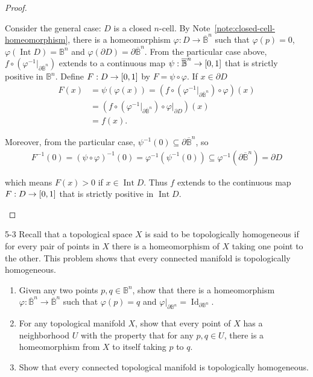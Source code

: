\begin{proof}
\begin{enumerate}[label={(\alph*)}]
		      Consider the general case: $D$ is a closed $n$-cell. By Note~\ref{note:closed-cell-homeomorphism}, there is a homeomorphism $\varphi: D \to \overline{\mathbb{B}}^{n}$ such that $\varphi(p) = 0$, $\varphi(\operatorname{Int} D) = \mathbb{B}^{n}$ and $\varphi(\partial D) = \partial\overline{\mathbb{B}}^{n}$. From the particular case above, $f\circ (\varphi^{-1}\vert_{\partial\overline{\mathbb{B}}^{n}})$ extends to a continuous map $\psi: \overline{\mathbb{B}}^{n} \to \left[{0, 1}\right]$ that is strictly positive in $\mathbb{B}^{n}$. Define $F: D \to \left[{0, 1}\right]$ by $F = \psi \circ \varphi$. If $x \in \partial D$
		      \begin{align*}
			      F(x) & = \psi(\varphi(x)) = (f\circ (\varphi^{-1}\vert_{\partial\overline{\mathbb{B}}^{n}}) \circ \varphi)(x) \\
			           & = (f \circ (\varphi^{-1}\vert_{\partial\overline{\mathbb{B}}^{n}}) \circ \varphi\vert_{\partial D})(x) \\
			           & = f(x).
		      \end{align*}

		      Moreover, from the particular case, $\psi^{-1}(0) \subseteq \partial\overline{\mathbb{B}}^{n}$, so
		      \begin{align*}
			      F^{-1}(0) = {(\psi \circ \varphi)}^{-1}(0) = \varphi^{-1}(\psi^{-1}(0)) \subseteq \varphi^{-1}(\partial\overline{\mathbb{B}}^{n}) = \partial D
		      \end{align*}

		      which means $F(x) > 0$ if $x \in \operatorname{Int} D$. Thus $f$ extends to the continuous map $F: D \to \left[{0, 1}\right]$ that is strictly positive in $\operatorname{Int} D$.
	\end{enumerate}
\end{proof}

\begin{problem}{5-3}\label{problem:5-3}
Recall that a topological space $X$ is said to be topologically homogeneous
if for every pair of points in $X$ there is a homeomorphism of $X$ taking one
point to the other. This problem shows that every connected manifold is
topologically homogeneous.
\begin{enumerate}[label={(\alph*)}]
	\item Given any two points $p, q \in \mathbb{B}^{n}$, show that there is a homeomorphism $\varphi: \overline{\mathbb{B}}^{n} \to \overline{\mathbb{B}}^{n}$ such that $\varphi(p) = q$ and $\varphi\vert_{\partial\mathbb{B}^{n}} = \operatorname{Id}_{\partial\mathbb{B}^{n}}$.
	\item For any topological manifold $X$, show that every point of $X$ has a neighborhood $U$ with the property that for any $p, q \in U$, there is a homeomorphism from $X$ to itself taking $p$ to $q$.
	\item Show that every connected topological manifold is topologically homogeneous.
\end{enumerate}
\end{problem}

